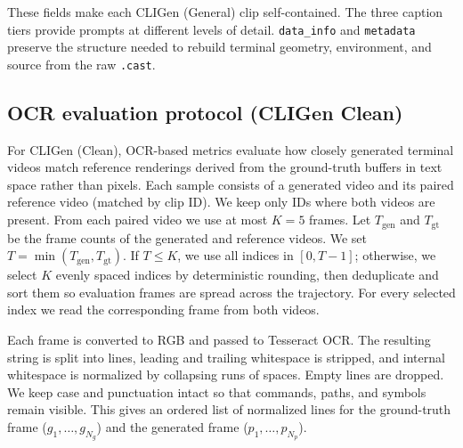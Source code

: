 These fields make each CLIGen (General) clip self-contained.
The three caption tiers provide prompts at different levels of detail.
\texttt{data\_info} and \texttt{metadata} preserve the structure needed to rebuild terminal geometry, environment, and source from the raw \texttt{.cast}. 

\subsection{OCR evaluation protocol (CLIGen Clean)}
For CLIGen (Clean), OCR-based metrics evaluate how closely generated terminal videos match reference renderings derived from the ground-truth buffers in text space rather than pixels.
Each sample consists of a generated video and its paired reference video (matched by clip ID).
We keep only IDs where both videos are present. 
From each paired video we use at most $K{=}5$ frames.
Let $T_\text{gen}$ and $T_\text{gt}$ be the frame counts of the generated and reference videos.
We set $T=\min(T_\text{gen},T_\text{gt})$.
If $T \le K$, we use all indices in $[0, T{-}1]$; otherwise, we select $K$ evenly spaced indices by deterministic rounding, then deduplicate and sort them so evaluation frames are spread across the trajectory.
For every selected index we read the corresponding frame from both videos.

Each frame is converted to RGB and passed to Tesseract OCR.
The resulting string is split into lines, leading and trailing whitespace is stripped, and internal whitespace is normalized by collapsing runs of spaces.
Empty lines are dropped.
We keep case and punctuation intact so that commands, paths, and symbols remain visible.
This gives an ordered list of normalized lines for the ground-truth frame ($g_1,\dots,g_{N_g}$) and the generated frame ($p_1,\dots,p_{N_p}$).


